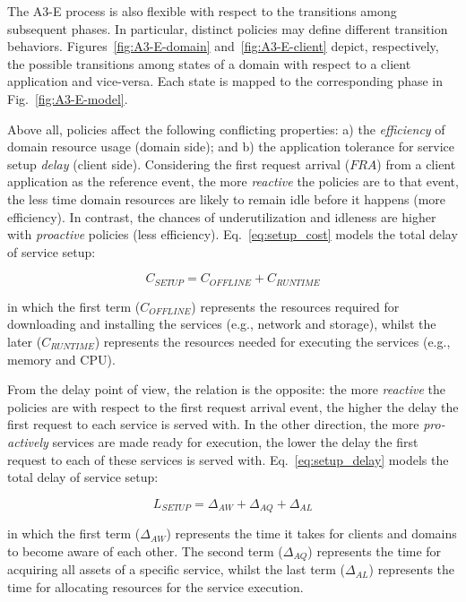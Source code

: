 
The A3-E process is also flexible with respect to the transitions among subsequent phases. In particular, distinct policies may define different transition behaviors. Figures~\ref{fig:A3-E-domain} and~\ref{fig:A3-E-client} depict, respectively, the possible transitions among states of a domain with respect to a client application and vice-versa. Each state is mapped to the corresponding phase in Fig.~\ref{fig:A3-E-model}. 

Above all, policies affect the following conflicting properties: a) the \textit{efficiency} of domain resource usage (domain side); and b) the application tolerance for service setup \textit{delay} (client side). Considering the first request arrival ($FRA$) from a client application as the reference event, the more \textit{reactive} the policies are to that event, the less time domain resources are likely to remain idle before it happens (more efficiency). In contrast, the chances of underutilization and idleness are higher with \textit{proactive} policies (less efficiency). Eq.~\ref{eq:setup_cost} models the total delay of service setup:

\begin{equation}\label{eq:setup_cost}
C_{SETUP} = C_{OFFLINE} + C_{RUNTIME}
\end{equation}

\noindent
in which the first term ($C_{OFFLINE}$) represents the resources required for downloading and installing the services (e.g., network and storage), whilst the later ($C_{RUNTIME}$) represents the resources needed for executing the services (e.g., memory and CPU). 

From the delay point of view, the relation is the opposite: the more \textit{reactive} the policies are with respect to the first request arrival event, the higher the delay the first request to each service is served with. In the other direction, the more \textit{pro-actively} services are made ready for execution, the lower the delay the first request to each of these services is served with. Eq.~\ref{eq:setup_delay} models the total delay of service setup:

\begin{equation}\label{eq:setup_delay}
L_{SETUP} = \Delta_{AW} + \Delta_{AQ} + \Delta_{AL}
\end{equation}

\noindent
in which the first term ($\Delta_{AW}$) represents the time it takes for clients and domains to become aware of each other. The second term ($\Delta_{AQ}$) represents the time for acquiring all assets of a specific service, whilst the last term ($\Delta_{AL}$) represents the time for allocating resources for the service execution. 

